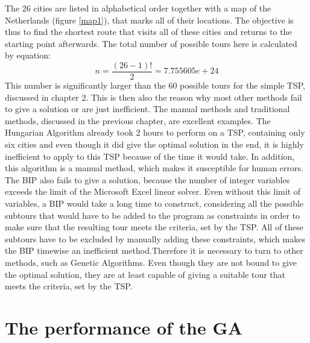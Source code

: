 \newpage
\par

The 26 cities are listed in alphabetical order together with a map of the Netherlands (figure \ref{map1}), that marks all of their locations. The objective is thus to find the shortest route that visits all of these cities and returns to the starting point afterwards. The total number of possible tours here is calculated by equation: %
\[n = \frac{(26-1)!}{2} =  7.755605e+24\]
This number is significantly larger than the 60 possible tours for the simple TSP, discussed in chapter 2. This is then also the reason why most other methods fail to give a solution or are just inefficient. The manual methods and traditional methods, discussed in the previous chapter, are excellent examples. The Hungarian Algorithm already took 2 hours to perform on a TSP, containing only six cities and even though it did give the optimal solution in the end, it is highly inefficient to apply to this TSP because of the time it would take. In addition, this algorithm is a manual method, which makes it susceptible for human errors. The BIP also fails to give a solution, because the number of integer variables exceeds the limit of the Microsoft Excel linear solver. Even without this limit of variables, a BIP would take a long time to construct, considering all the possible subtours that would have to be added to the program as constraints in order to make sure that the resulting tour meets the criteria, set by the TSP. All of these subtours have to be excluded by manually adding these constraints, which makes the BIP timewise an inefficient method.Therefore it is necessary to turn to other methods, such as Genetic Algorithms. Even though they are not bound to give the optimal solution, they are at least capable of giving a suitable tour that meets the criteria, set by the TSP.

\section{The performance of the GA}

